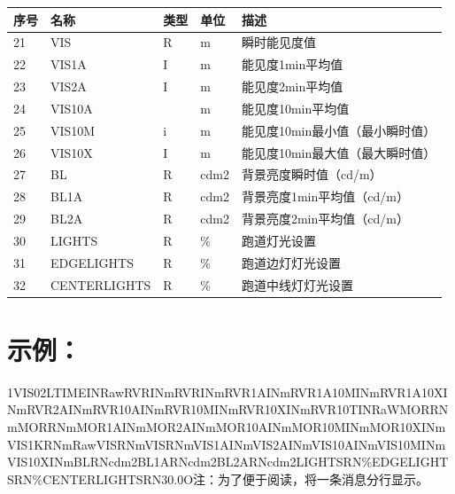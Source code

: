 \documentclass[
  10
]{article}
\begin{document}
\begin{longtable}[]{@{}|l|l|l|l|l|@{}}
\toprule\noalign{}
\endhead
\bottomrule\noalign{}
\endlastfoot
\hline
序号 & 名称 & 类型 & 单位 & 描述 \\
\hline
21 & VIS & R & m & 瞬时能见度值 \\
\hline
22 & VIS1A & I & m & 能见度1min平均值 \\
\hline
23 & VIS2A & I & m & 能见度2min平均值 \\
\hline
24 & VIS10A & & m & 能见度10min平均值 \\
\hline
25 & VIS10M & i & m & 能见度10min最小值（最小瞬时值） \\
\hline
26 & VIS10X & I & m & 能见度10min最大值（最大瞬时值） \\
\hline
27 & BL & R & cdm2 & 背景亮度瞬时值（cd/m） \\
\hline
28 & BL1A & R & cdm2 & 背景亮度1min平均值（cd/m） \\
\hline
29 & BL2A & R & cdm2 & 背景亮度2min平均值（cd/m） \\
\hline
30 & LIGHTS & R & \% & 跑道灯光设置 \\
\hline
31 & EDGELIGHTS & R & \% & 跑道边灯灯光设置 \\
\hline
32 & CENTERLIGHTS & R & \% & 跑道中线灯灯光设置 \\
\hline
\end{longtable}

\section{示例：}\label{ux793aux4f8b-4}

1\textbar\textbar VIS\textbar02LTIME\textbar I\textbar N\textbar RawRVR\textbar I\textbar N\textbar mRVR\textbar I\textbar N\textbar mRVR1A\textbar I\textbar N\textbar mRVR1A10M\textbar I\textbar N\textbar mRVR1A10X\textbar I\textbar N\textbar mRVR2A\textbar I\textbar N\textbar mRVR10A\textbar I\textbar N\textbar mRVR10M\textbar I\textbar N\textbar mRVR10X\textbar I\textbar N\textbar mRVR10T\textbar I\textbar N\textbar RaWMOR\textbar R\textbar N\textbar mMOR\textbar R\textbar N\textbar mMOR1A\textbar I\textbar N\textbar mMOR2A\textbar I\textbar N\textbar mMOR10A\textbar I\textbar N\textbar mMOR10M\textbar I\textbar N\textbar mMOR10X\textbar I\textbar N\textbar mVIS1K\textbar R\textbar N\textbar mRawVIS\textbar R\textbar N\textbar mVIS\textbar R\textbar N\textbar mVIS1A\textbar I\textbar N\textbar mVIS2A\textbar I\textbar N\textbar mVIS10A\textbar I\textbar N\textbar mVIS10M\textbar I\textbar N\textbar mVIS10X\textbar I\textbar N\textbar mBL\textbar R\textbar N\textbar cdm2BL1A\textbar R\textbar N\textbar cdm2BL2A\textbar R\textbar N\textbar cdm2LIGHTS\textbar R\textbar N\textbar\%EDGELIGHTS\textbar R\textbar N\textbar\%CENTERLIGHTS\textbar R\textbar N\textbar30.0O\textbar 注：为了便于阅读，将一条消息分行显示。
\end{document}
